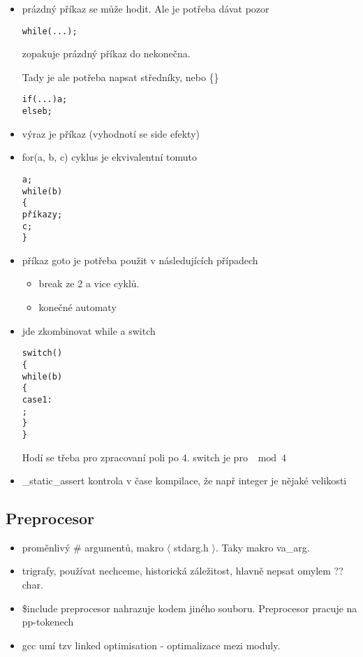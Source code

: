 \begin{itemize}
	\item prázdný příkaz se může hodit. Ale je potřeba dávat pozor

	\begin{alltt}
		while(...);
	\end{alltt}
	zopakuje prázdný příkaz do nekonečna.

	Tady je ale potřeba napsat středníky, nebo \{\}
	\begin{alltt}
		if(...) a;
		else b;
	\end{alltt}

	\item výraz je příkaz (vyhodnotí se side efekty)
	\item for(a, b, c) cyklus je ekvivalentní tomuto
	\begin{alltt}
		a;
		while(b)
		\{
			\tab příkazy;
			\tab c;
		\}
	\end{alltt}

	\item příkaz goto je potřeba použit v následujících případech
		\begin{itemize}
			\item break ze 2 a vice cyklů.
			\item konečné automaty
		\end{itemize}
	\item jde zkombinovat while a switch
	\begin{alltt}
		switch()
		\{
		\tab while(b)
		\tab \{
		\tab 	\tab case 1:
		\tab 	\tab ;
		\tab \}
		\}
	\end{alltt}
	Hodí se třeba pro zpracovaní poli po 4.
	switch je pro $\mod 4$

	\item \_static\_assert kontrola v čase kompilace, že např integer je nějaké velikosti
\end{itemize}

\subsection{Preprocesor}
\begin{itemize}
	\item proměnlivý \# argumentů, makro $\langle$ stdarg.h $\rangle$.
		Taky makro va\_arg.
	\item trigrafy, používat nechceme, historická záležitost, hlavně nepsat omylem ?? char.
	\item \$include preprocesor nahrazuje kodem jiného souboru.
		Preprocesor pracuje na pp-tokenech
	\item gcc umí tzv linked optimisation - optimalizace mezi moduly.
\end{itemize}


